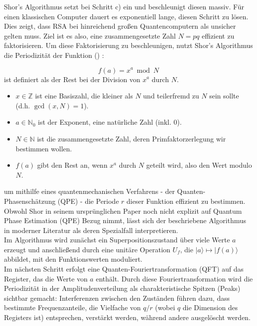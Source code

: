 Shor's Algorithmus setzt bei Schritt c) ein und beschleunigt diesen massiv. Für einen klassischen Computer dauert es exponentiell lange, diesen Schritt zu lösen. Dies zeigt, dass RSA bei hinreichend großen Quantencomputern als unsicher gelten muss. Ziel ist es also, eine zusammengesetzte Zahl \( N = pq \) effizient zu faktorisieren. Um diese Faktorisierung zu beschleunigen, nutzt Shor's Algorithmus die Periodizität der Funktion (\cite[10-11]{shor_polynomial-time_1994})
 :

\begin{definition} 
\[
f(a) = x^a \bmod N
\]
ist definiert als der Rest bei der Division von \(x^a\) durch \(N\).

\begin{itemize}
    \item \(x \in \mathbb{Z}\) ist eine Basiszahl, die kleiner als \(N\) und teilerfremd zu \(N\) sein sollte (d.h. \(\gcd(x, N) = 1\)).
    \item \(a \in \mathbb{N}_0\) ist der Exponent, eine natürliche Zahl (inkl. 0).
    \item \(N \in \mathbb{N}\) ist die zusammengesetzte Zahl, deren Primfaktorzerlegung wir bestimmen wollen.
    \item \(f(a)\) gibt den Rest an, wenn \(x^a\) durch \(N\) geteilt wird, also den Wert modulo \(N\).
\end{itemize}
\end{definition}
um mithilfe eines quantenmechanischen Verfahrens - der Quanten-\\Phasenschätzung (QPE) - die Periode \( r \) dieser Funktion effizient zu bestimmen. Obwohl Shor in seinem ursprünglichen Paper noch nicht explizit auf Quantum Phase Estimation (QPE) Bezug nimmt, lässt sich der beschriebene Algorithmus in moderner Literatur als deren Spezialfall interpretieren.\\

Im Algorithmus wird zunächst ein Superpositionszustand über viele Werte \( a \) erzeugt und anschließend durch eine unitäre Operation \( U_f \), die \( |a\rangle \mapsto |f(a)\rangle \) abbildet, mit den Funktionswerten moduliert.\\

Im nächsten Schritt erfolgt eine Quanten-Fouriertransformation (QFT) auf das Register, das die Werte von \( a \) enthält. Durch diese Fouriertransformation wird die Periodizität in der Amplitudenverteilung als charakteristische Spitzen (Peaks) sichtbar gemacht: Interferenzen zwischen den Zuständen führen dazu, dass bestimmte Frequenzanteile, die Vielfache von \( q/r \) (wobei \( q \) die Dimension des Registers ist) entsprechen, verstärkt werden, während andere ausgelöscht werden.\\

